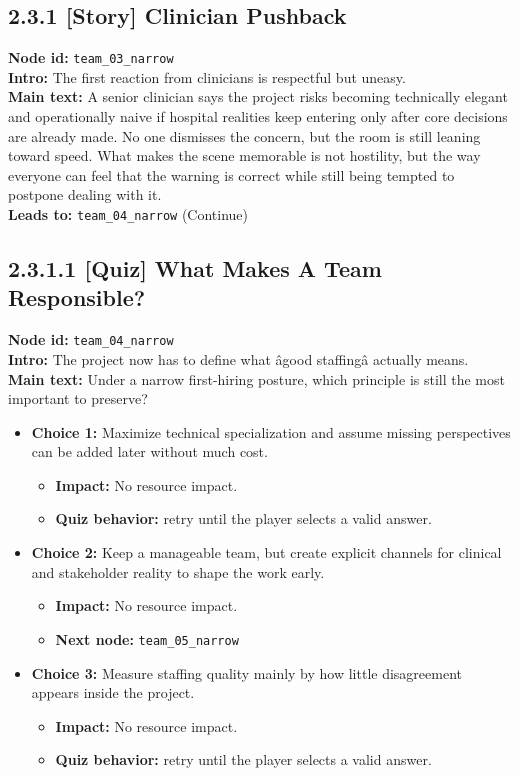 \documentclass[11pt]{article}
\begin{document}
\subsection*{2.3.1 [Story] Clinician Pushback}
\textbf{Node id:} \texttt{team\_03\_narrow}\\
\textbf{Intro:} The first reaction from clinicians is respectful but uneasy.\\
\textbf{Main text:} A senior clinician says the project risks becoming technically elegant and operationally naive if hospital realities keep entering only after core decisions are already made. No one dismisses the concern, but the room is still leaning toward speed. What makes the scene memorable is not hostility, but the way everyone can feel that the warning is correct while still being tempted to postpone dealing with it.\\
\textbf{Leads to:} \texttt{team\_04\_narrow} (Continue)\\
\subsection*{2.3.1.1 [Quiz] What Makes A Team Responsible?}
\textbf{Node id:} \texttt{team\_04\_narrow}\\
\textbf{Intro:} The project now has to define what âgood staffingâ actually means.\\
\textbf{Main text:} Under a narrow first-hiring posture, which principle is still the most important to preserve?\\
\begin{itemize}
\item \textbf{Choice 1:} Maximize technical specialization and assume missing perspectives can be added later without much cost.
\begin{itemize}
\item \textbf{Impact:} No resource impact.
\item \textbf{Quiz behavior:} retry until the player selects a valid answer.
\end{itemize}
\item \textbf{Choice 2:} Keep a manageable team, but create explicit channels for clinical and stakeholder reality to shape the work early.
\begin{itemize}
\item \textbf{Impact:} No resource impact.
\item \textbf{Next node:} \texttt{team\_05\_narrow}
\end{itemize}
\item \textbf{Choice 3:} Measure staffing quality mainly by how little disagreement appears inside the project.
\begin{itemize}
\item \textbf{Impact:} No resource impact.
\item \textbf{Quiz behavior:} retry until the player selects a valid answer.
\end{itemize}
\end{itemize}
\end{document}
